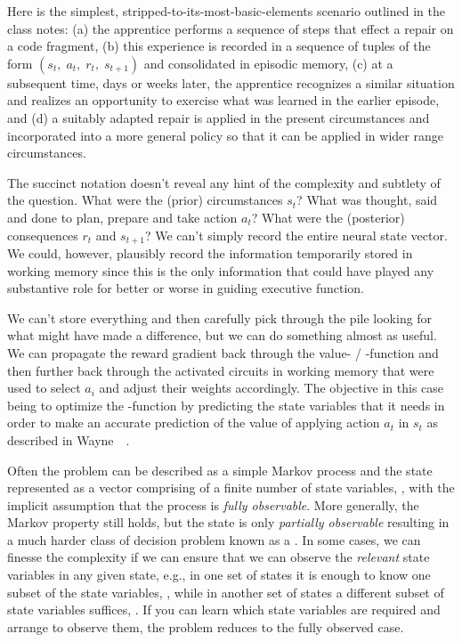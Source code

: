 Here is the simplest, stripped-to-its-most-basic-elements scenario outlined in the class notes: (a) the apprentice performs a sequence of steps that effect a repair on a code fragment, (b) this experience is recorded in a sequence of tuples of the form $(s_{t},\;a_{t},\;r_{t},\;s_{t+1})$ and consolidated in episodic memory, (c) at a subsequent time, days or weeks later, the apprentice recognizes a similar situation and realizes an opportunity to exercise what was learned in the earlier episode, and (d) a suitably adapted repair is applied in the present circumstances and incorporated into a more general policy so that it can be applied in wider range circumstances.

The succinct notation doesn't reveal any hint of the complexity and subtlety of the question. What were the (prior) circumstances \emdash{} $s_{t}$? What was thought, said and done to plan, prepare and take action \emdash{} $a_{t}$? What were the (posterior) consequences \emdash{} $r_{t}$ and $s_{t+1}$? We can't simply record the entire neural state vector. We could, however, plausibly record the information temporarily stored in working memory since this is the only information that could have played any substantive role \emdash{} for better or worse \emdash{} in guiding executive function. 

We can't store everything and then carefully pick through the pile looking for what might have made a difference, but we can do something almost as useful. We can propagate the reward gradient back through the value- / -function and then further back through the activated circuits in working memory that were used to select $a_{i}$ and adjust their weights accordingly. The objective in this case being to optimize the {}-function by predicting the state variables that it needs in order to make an accurate prediction of the value of applying action $a_{t}$ in $s_{t}$ as described in Wayne~\etal{}~\cite{WayneetalCoRR-18}.

Often the problem can be described as a simple Markov process and the state represented as a vector comprising of a finite number of state variables, \statevarvar{}, with the implicit assumption that the process is {\it{fully observable}}. More generally, the Markov property still holds, but the state is only {\it{partially observable}} resulting in a much harder class of decision problem known as a {}. In some cases, we can finesse the complexity if we can ensure that we can observe the {\it{relevant}} state variables in any given state, e.g., in one set of states it is enough to know one subset of the state variables, \statevaruno{}, while in another set of states a different subset of state variables suffices, \statevardos{}. If you can learn which state variables are required and arrange to observe them, the problem reduces to the fully observed case. 


